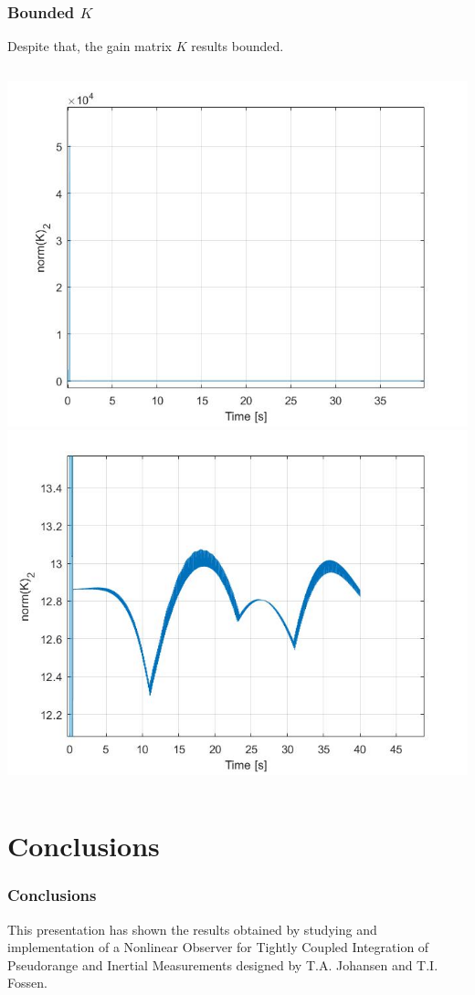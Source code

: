 \documentclass{beamer}
\begin{document}
	\begin{frame}
		\frametitle{Bounded $K$}
		Despite that, the gain matrix $K$ results bounded.
		\begin{columns}[t]
			\centering
			\includegraphics[scale=0.25]{kric}\\
			\centering
			\includegraphics[scale=0.25]{kric2}\\
		\end{columns}
	\end{frame}
	
	\section{Conclusions}
		\begin{frame}
		\frametitle{Conclusions}
		This presentation has shown the results
		obtained by studying and implementation
		of a Nonlinear Observer for Tightly Coupled Integration
		of Pseudorange and Inertial Measurements
		designed by T.A. Johansen and T.I. Fossen.
		
		\end{frame}
\end{document}
